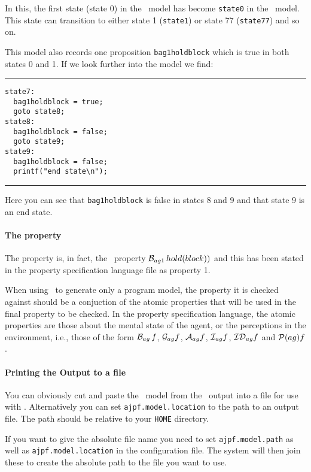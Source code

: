\documentclass[a4]{article}
\begin{document}
In this, the first state (state 0) in the \ajpf\ model has become \texttt{state0} in the \promela\ model.  This state can transition to either state 1 (\texttt{state1}) or state 77 (\texttt{state77}) and so on.

This model also records one proposition \texttt{bag1holdblock} which is true in both states 0 and 1. If we look further into the model we find:

\noindent\rule{\textwidth}{1pt}
\begin{small}
\begin{verbatim}
state7:
  bag1holdblock = true;
  goto state8;
state8:
  bag1holdblock = false;
  goto state9;
state9:
  bag1holdblock = false;
  printf("end state\n");
\end{verbatim}
\end{small}
\rule{\textwidth}{1pt}
Here you can see that \texttt{bag1holdblock} is false in states 8 and 9 and that state 9 is an end state.

\paragraph{The property} The property is, in fact, the \ajpf\ property $\mathrm{{\cal B}}_{ag1} \, hold(block))$ and this has been stated in the property specification language file as property 1.  

When using \ajpf\ to generate only a program model, the property it is checked against should be a conjuction of the atomic properties that will be used in the final property to be checked.  In the property specification language, the atomic properties are those about the mental state of the agent, or the perceptions in the environment, i.e., those of the form $\mathrm{{\cal B}}_{ag} \, f$, $\mathrm{{\cal G}}_{ag} f$, $\mathrm{{\cal A}}_{ag} f$, $\mathrm{{\cal I}}_{ag} f$, $\mathrm{{\cal ID}}_{ag} f$ and $\mathrm{{\cal P}}(ag){f}$.

\paragraph{Printing the Output to a file} You can obviously cut and paste the \promela\ model from the \ajpf\ output into a file for use with \spin.  Alternatively you can set \texttt{ajpf.model.location} to the path to an output file.  The path should be relative to your \texttt{HOME} directory.  

If you want to give the absolute file name you need to set \texttt{ajpf.model.path} as well as \texttt{ajpf.model.location} in the configuration file.  The system will then join these to create the absolute path to the file you want to use.
\end{document}
